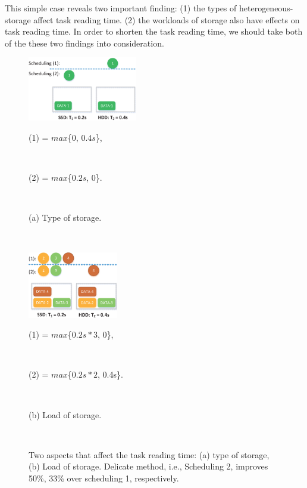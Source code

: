 \documentclass[conference]{IEEEtran}
\begin{document}
This simple case reveals two important finding: (1) the types of heterogeneous-storage affect task reading time. (2) the workloads of storage also have effects on task reading time. In order to shorten the task reading time, we should take both of the these two findings into consideration.


\begin{figure}[!t]
\centering
    \begin{minipage}{4.78cm}
        \includegraphics[width=4.78cm]{fig_example1_4.eps}
        \centerline{\footnotesize{(1) = $max$\{0, $0.4s$\},}}\\
        \centerline{\footnotesize{(2) = $max$\{$0.2s$, 0\}.}}\\
         \centerline{(a) Type of storage.}\\
    \end{minipage}
    \begin{minipage}{3.95cm}
        \includegraphics[width=3.95cm]{fig_example2_3.eps}
        \centerline{\footnotesize{(1) = $max$\{$0.2s*3$, 0\},}}\\
        \centerline{\footnotesize{(2) = $max$\{$0.2s*2$, 0.4s\}.}}\\
         \centerline{(b) Load of storage.}\\
    \end{minipage}
    \vspace{-0.4cm}
    \caption{Two aspects that affect the task reading time: (a) type of storage, (b) Load of storage. Delicate method, i.e., Scheduling 2, improves 50\%, 33\% over scheduling 1, respectively.}
    \label{Fig:example}
    \vspace{-0.2cm}
\end{figure}
\end{document}
